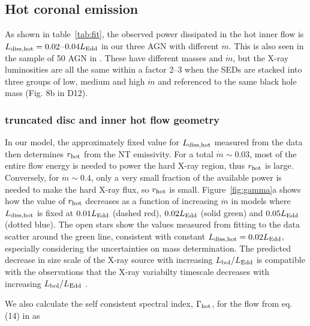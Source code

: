 \documentclass[a4paper,fleqn,usenatbib]{mnras}
\begin{document}
\subsection{Hot coronal emission}
\label{sec:hot}

As shown in table~\ref{tab:fit}, the observed power dissipated in the
hot inner flow is $L_{\rm diss,hot}=0.02$--$0.04L_{\rm Edd}$ in
our three AGN with different $\dot{m}$.  This is also seen in the
sample of 50 AGN in \cite{jin2012a}. These have different masses and
$\dot{m}$, but the X-ray luminosities are all the same within a
factor 2--3 when the SEDs are stacked into three groups of low,
medium and high $\dot{m}$ and referenced to the same black hole mass
(Fig. 8b in D12). 

\subsubsection{truncated disc and inner hot flow geometry}
\label{sec:truncated-disc}
In our model, the approximately fixed value
for $L_{\rm diss,hot}$ measured from the data then determines $r_{\rm
  hot}$ from the NT emissivity.  For a total $\dot{m}\sim 0.03$, most
of the entire flow energy is needed to power the hard X-ray region,
thus $r_{\rm hot}$ is large. Conversely, for $\dot{m}\sim 0.4$, only a
very small fraction of the available power is needed to make the hard
X-ray flux, so $r_{\rm hot}$ is small. Figure~\ref{fig:gamma}a shows
how the value of $r_{\rm hot}$ decreases as a function of increasing
$\dot{m}$ in models where $L_{\rm diss,hot}$ is fixed at $0.01L_{\rm Edd}$
(dashed red), $0.02L_{\rm Edd}$ (solid green) and $0.05L_{\rm Edd}$
(dotted blue).  The open stars show the values
measured from fitting to the data scatter around the green line,
consistent with constant $L_{\rm diss,hot}=0.02L_{\rm Edd}$,
especially considering the uncertainties on mass determination.  The
predicted decrease in size scale of the X-ray source with increasing
$L_{\rm bol}/L_{\rm Edd}$ is compatible with the observations that the
X-ray variabilty timescale decreases with increasing $L_{\rm
  bol}/L_{\rm Edd}$ \citep{mchardy2006}.



We also calculate the self consistent spectral index, $\Gamma_{\rm
  hot}$, for the flow from eq.(14) in \cite{beloborodov1999} as
\end{document}
